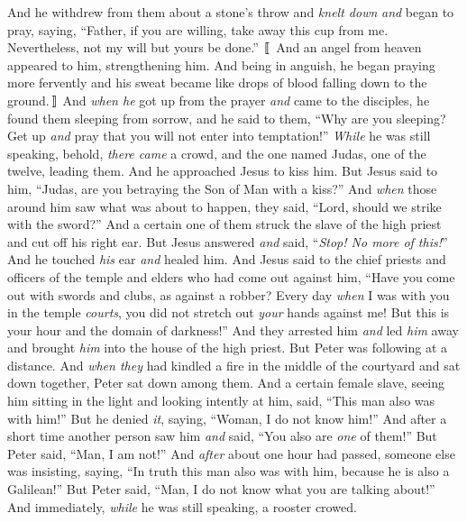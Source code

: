 \begin{biblechapter}
\verse And he withdrew from them about a stone’s throw and \textit{knelt down} \textit{and} began to pray,
\verse saying, “Father, if you are willing, take away this cup from me. Nevertheless, not my will but yours be done.” 〚
\verse And an angel from heaven appeared to him, strengthening him.
\verse And being in anguish, he began praying more fervently and his sweat became like drops of blood falling down to the ground.〛
\verse And \textit{when he} got up from the prayer \textit{and} came to the disciples, he found them sleeping from sorrow,
\verse and he said to them, “Why are you sleeping? Get up \textit{and} pray that you will not enter into temptation!”
 \textit{While} he was still speaking, behold, \textit{there came} a crowd, and the one named Judas, one of the twelve, leading them. And he approached Jesus to kiss him.
\verse But Jesus said to him, “Judas, are you betraying the Son of Man with a kiss?”
\verse And \textit{when} those around him saw what was about to happen, they said, “Lord, should we strike with the sword?”
\verse And a certain one of them struck the slave of the high priest and cut off his right ear.
\verse But Jesus answered \textit{and} said, “\textit{Stop! No more of this!}” And he touched \textit{his} ear \textit{and} healed him.
\verse And Jesus said to the chief priests and officers of the temple and elders who had come out against him, “Have you come out with swords and clubs, as against a robber?
\verse Every day \textit{when} I was with you in the temple \textit{courts}, you did not stretch out \textit{your} hands against me! But this is your hour and the domain of darkness!”
 And they arrested him \textit{and} led \textit{him} away and brought \textit{him} into the house of the high priest. But Peter was following at a distance.
\verse And \textit{when they} had kindled a fire in the middle of the courtyard and sat down together, Peter sat down among them.
\verse And a certain female slave, seeing him sitting in the light and looking intently at him, said, “This man also was with him!”
\verse But he denied \textit{it}, saying, “Woman, I do not know him!”
\verse And after a short time another person saw him \textit{and} said, “You also are \textit{one} of them!” But Peter said, “Man, I am not!”
\verse And \textit{after} about one hour had passed, someone else was insisting, saying, “In truth this man also was with him, because he is also a Galilean!”
\verse But Peter said, “Man, I do not know what you are talking about!” And immediately, \textit{while} he was still speaking, a rooster crowed.

\end{biblechapter}
